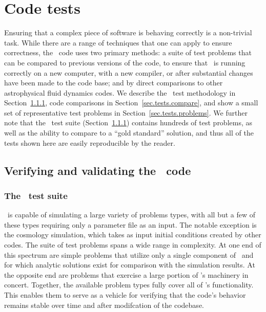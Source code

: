 
\section{Code tests}
\label{sec.tests}

Ensuring that a complex piece of software is behaving correctly is a
non-trivial task.  While there are a range of techniques that one can
apply to ensure correctness, the \enzo\ code uses two primary methods:
a suite of test problems that can be compared to previous versions of
the code, to ensure that \enzo\ is running correctly on a new
computer, with a new compiler, or after substantial changes have been
made to the code base; and by direct comparisons to other
astrophysical fluid dynamics codes.  We describe the \enzo\ test
methodology in Section~\ref{sec.tests.suite}, code comparisons in
Section~\ref{sec.tests.compare}, and show a small set of
representative test problems in Section~\ref{sec.tests.problems}.  We
further note that the \enzo\ test suite
(Section~\ref{sec.tests.suite}) contains hundreds of test problems, as
well as the ability to compare to a ``gold standard'' solution, and
thus all of the tests shown here are easily reproducible by the
reader.

\subsection{Verifying and validating the \enzo\ code}
\label{sec.tests.vandv}

\subsubsection{The \enzo\ test suite}
\label{sec.tests.suite}

\enzo\ is capable of simulating a large variety of problems types,
with all but a few of these types requiring only a parameter file as an
input.  The notable exception is the cosmology simulation, which takes
as input initial conditions created by other codes.  The suite of test
problems spans a wide range in complexity.  At one end of this spectrum
are simple problems that utilize only a single component of \enzo\ and
for which analytic solutions exist for comparison with the simulation
results.  At the opposite end are problems that exercise a large
portion of \enzo's machinery in concert.  Together, the available
problem types fully cover all of \enzo's functionality.  This enables
them to serve as a vehicle for verifying that the code's behavior
remains stable over time and after modifcation of the codebase.

